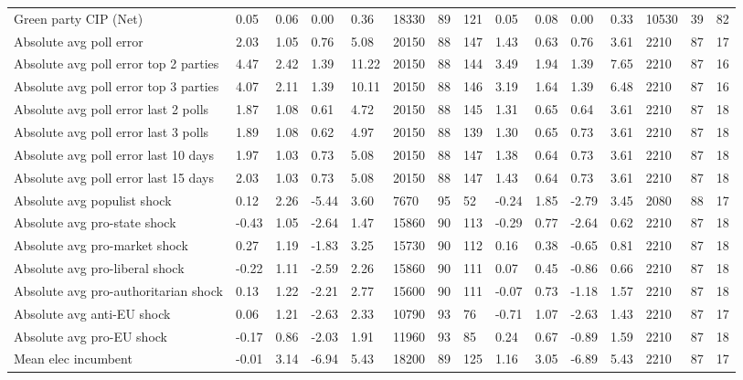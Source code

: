 \begin{longtable}{lllllllllllllll}
Green party CIP (Net) & 0.05 & 0.06 & 0.00 & 0.36 & 18330 & 89 & 121 & 0.05 & 0.08 & 0.00 & 0.33 & 10530 & 39 & 82\\
Absolute avg poll error & 2.03 & 1.05 & 0.76 & 5.08 & 20150 & 88 & 147 & 1.43 & 0.63 & 0.76 & 3.61 & 2210 & 87 & 17\\
Absolute avg poll error top 2 parties & 4.47 & 2.42 & 1.39 & 11.22 & 20150 & 88 & 144 & 3.49 & 1.94 & 1.39 & 7.65 & 2210 & 87 & 16\\
Absolute avg poll error top 3 parties & 4.07 & 2.11 & 1.39 & 10.11 & 20150 & 88 & 146 & 3.19 & 1.64 & 1.39 & 6.48 & 2210 & 87 & 16\\
Absolute avg poll error last 2 polls & 1.87 & 1.08 & 0.61 & 4.72 & 20150 & 88 & 145 & 1.31 & 0.65 & 0.64 & 3.61 & 2210 & 87 & 18\\
\addlinespace
Absolute avg poll error last 3 polls & 1.89 & 1.08 & 0.62 & 4.97 & 20150 & 88 & 139 & 1.30 & 0.65 & 0.73 & 3.61 & 2210 & 87 & 18\\
Absolute avg poll error last 10 days & 1.97 & 1.03 & 0.73 & 5.08 & 20150 & 88 & 147 & 1.38 & 0.64 & 0.73 & 3.61 & 2210 & 87 & 18\\
Absolute avg poll error last 15 days & 2.03 & 1.03 & 0.73 & 5.08 & 20150 & 88 & 147 & 1.43 & 0.64 & 0.73 & 3.61 & 2210 & 87 & 18\\
Absolute avg populist shock & 0.12 & 2.26 & -5.44 & 3.60 & 7670 & 95 & 52 & -0.24 & 1.85 & -2.79 & 3.45 & 2080 & 88 & 17\\
Absolute avg pro-state shock & -0.43 & 1.05 & -2.64 & 1.47 & 15860 & 90 & 113 & -0.29 & 0.77 & -2.64 & 0.62 & 2210 & 87 & 18\\
\addlinespace
Absolute avg pro-market shock & 0.27 & 1.19 & -1.83 & 3.25 & 15730 & 90 & 112 & 0.16 & 0.38 & -0.65 & 0.81 & 2210 & 87 & 18\\
Absolute avg pro-liberal shock & -0.22 & 1.11 & -2.59 & 2.26 & 15860 & 90 & 111 & 0.07 & 0.45 & -0.86 & 0.66 & 2210 & 87 & 18\\
Absolute avg pro-authoritarian shock & 0.13 & 1.22 & -2.21 & 2.77 & 15600 & 90 & 111 & -0.07 & 0.73 & -1.18 & 1.57 & 2210 & 87 & 18\\
Absolute avg anti-EU shock & 0.06 & 1.21 & -2.63 & 2.33 & 10790 & 93 & 76 & -0.71 & 1.07 & -2.63 & 1.43 & 2210 & 87 & 17\\
Absolute avg pro-EU shock & -0.17 & 0.86 & -2.03 & 1.91 & 11960 & 93 & 85 & 0.24 & 0.67 & -0.89 & 1.59 & 2210 & 87 & 18\\
\addlinespace
Mean elec incumbent & -0.01 & 3.14 & -6.94 & 5.43 & 18200 & 89 & 125 & 1.16 & 3.05 & -6.89 & 5.43 & 2210 & 87 & 17\\

\end{longtable}
